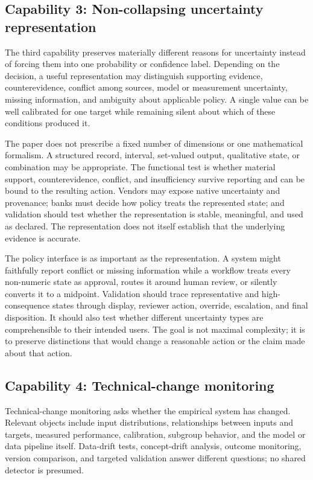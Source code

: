 \subsection{Capability 3: Non-collapsing uncertainty representation}
\label{sec:primitives:confidence-characterization}

The third capability preserves materially different reasons for uncertainty
instead of forcing them into one probability or confidence label. Depending on
the decision, a useful representation may distinguish supporting evidence,
counterevidence, conflict among sources, model or measurement uncertainty,
missing information, and ambiguity about applicable policy. A single value can
be well calibrated for one target while remaining silent about which of these
conditions produced it.

The paper does not prescribe a fixed number of dimensions or one mathematical
formalism. A structured record, interval, set-valued output, qualitative state,
or combination may be appropriate. The functional test is whether material
support, counterevidence, conflict, and insufficiency survive reporting and can
be bound to the resulting action. Vendors may expose native uncertainty and
provenance; banks must decide how policy treats the represented state; and
validation should test whether the representation is stable, meaningful, and
used as declared. The representation does not itself establish that the
underlying evidence is accurate.

The policy interface is as important as the representation. A system might
faithfully report conflict or missing information while a workflow treats every
non-numeric state as approval, routes it around human review, or silently
converts it to a midpoint. Validation should trace representative and
high-consequence states through display, reviewer action, override, escalation,
and final disposition. It should also test whether different uncertainty types
are comprehensible to their intended users. The goal is not maximal complexity;
it is to preserve distinctions that would change a reasonable action or the
claim made about that action.

\subsection{Capability 4: Technical-change monitoring}
\label{sec:primitives:technical-change}

Technical-change monitoring asks whether the empirical system has changed.
Relevant objects include input distributions, relationships between inputs and
targets, measured performance, calibration, subgroup behavior, and the model or
data pipeline itself. Data-drift tests, concept-drift analysis, outcome
monitoring, version comparison, and targeted validation answer different
questions; no shared detector is presumed.

